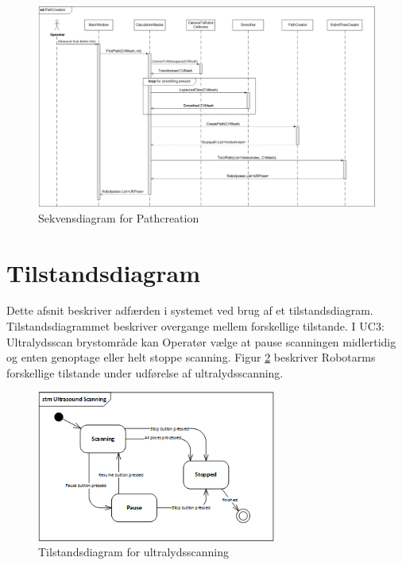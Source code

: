 \begin{figure}[H]
    \centering
    \includegraphics[width=1.4\textwidth, angle =90]{figurer/d/Design/Sequence/sd_pathcreation}
    \caption{Sekvensdiagram for Pathcreation}
    \label{sd_pathcreation}
\end{figure}
\newpage

\section{Tilstandsdiagram}
Dette afsnit beskriver adfærden i systemet ved brug af et tilstandsdiagram. Tilstandsdiagrammet beskriver overgange mellem forskellige tilstande. I UC3: Ultralydsscan brystområde kan Operatør vælge at pause scanningen midlertidig og enten genoptage eller helt stoppe scanning. Figur \ref{stm_Ultra} beskriver Robotarms forskellige tilstande under udførelse af ultralydsscanning. 

\begin{figure}[H]
    \centering
    \includegraphics[width=0.7\textwidth]{figurer/d/Design/stm_UC3}
    \caption{Tilstandsdiagram for ultralydsscanning}
    \label{stm_Ultra}
\end{figure}



